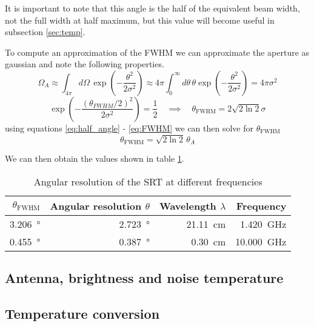 It is important to note that this angle is the half of the equivalent beam width, not the full width at half maximum, but this value will become useful in subsection \ref{sec:temp}.

To compute an approximation of the FWHM we can approximate the aperture as gaussian \cite[p. 2]{script} and note the following properties.
\begin{equation}
    \Omega_A \approx \int_{4\pi } d\Omega\, \exp{\left( -\frac{\theta^2}{2\sigma^2} \right)} \approx 4\pi \int_0^{\infty} d\theta \, \theta \exp{\left( -\frac{\theta^2}{2\sigma^2} \right)} = 4\pi \sigma^2
    \label{eq:gauss_integral}
\end{equation}
\begin{equation}
    \exp{\left( -\frac{(\theta_{FWHM}/2)^2}{2\sigma^2}\right)} = \frac{1}{2} \quad \implies \quad \theta_{\text{FWHM}} = 2 \sqrt{2\ln{2}} \sigma \label{eq:FWHM}
\end{equation}
using equations \eqref{eq:half_angle} - \eqref{eq:FWHM} we can then solve for $\theta_{\text{FWHM}}$
\begin{equation}
    \theta_{\text{FWHM}} = \sqrt{2\ln{2}} \, \theta_A
\end{equation}

We can then obtain the values shown in table \ref{tab:ang_res}.
\begin{table}[H]
    \centering
    \begin{tabular}{rrrr}
        \toprule
        $\theta_{\text{FWHM}}$ & Angular resolution $\theta$ & Wavelength $\lambda$ & Frequency\\
        \midrule
        \SI{3.206}{\degree} &\SI{2.723}{\degree} & \SI{21.11}{cm} & \SI{1.420}{\giga \hertz}\\
        \SI{0.455}{\degree} &\SI{0.387}{\degree} & \SI{0.30}{cm} & \SI{10.000}{\giga \hertz}\\
        \bottomrule
    \end{tabular}
    \caption{Angular resolution of the SRT at different frequencies}
    \label{tab:ang_res}
\end{table}
\subsection{Antenna, brightness and noise temperature}

\subsection{Temperature conversion}

